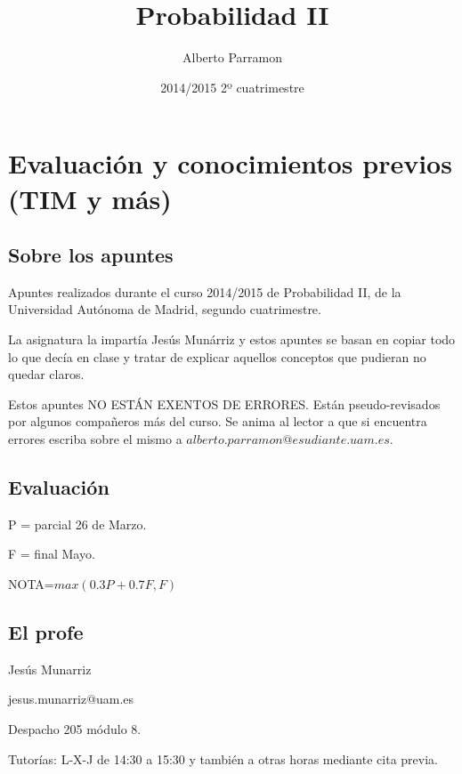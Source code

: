 \documentclass{apuntes}
\author{Alberto Parramon}
\date{2014/2015 2º cuatrimestre}
\title{Probabilidad II}
\begin{document}
\pagestyle{plain}
\maketitle

\tableofcontents
\newpage
\chapter{Evaluación y conocimientos previos (TIM y más)}


\section{Sobre los apuntes}
Apuntes realizados durante el curso 2014/2015 de Probabilidad II, de la Universidad Autónoma de Madrid, segundo cuatrimestre. 

La asignatura la impartía Jesús Munárriz y estos apuntes se basan en copiar todo lo que decía en clase y tratar de explicar aquellos conceptos que pudieran no quedar claros.

Estos apuntes NO ESTÁN EXENTOS DE ERRORES. Están pseudo-revisados por algunos compañeros más del curso. Se anima al lector a que si encuentra errores escriba sobre el mismo a $alberto.parramon@esudiante.uam.es$.


\section{Evaluación}
P = parcial 26 de Marzo.

F = final Mayo.

NOTA=$max(0.3P+0.7F,F)$ 

\section{El profe}
Jesús Munarriz

jesus.munarriz@uam.es

Despacho 205 módulo 8.

Tutorías: L-X-J de 14:30 a 15:30 y también a otras horas mediante cita previa.
\end{document}
